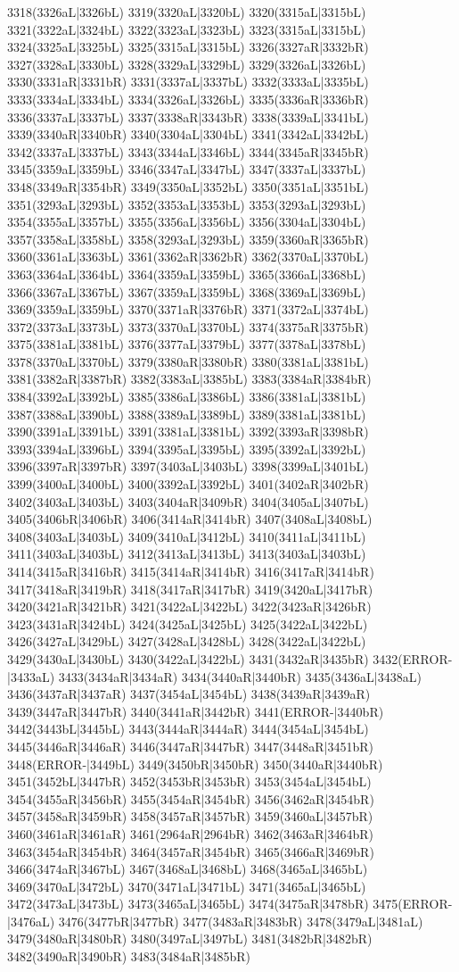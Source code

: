 3318(3326aL|3326bL) 3319(3320aL|3320bL) 3320(3315aL|3315bL) 3321(3322aL|3324bL) 3322(3323aL|3323bL) 3323(3315aL|3315bL) 3324(3325aL|3325bL) 3325(3315aL|3315bL) 3326(3327aR|3332bR) 3327(3328aL|3330bL) 3328(3329aL|3329bL) 3329(3326aL|3326bL) 3330(3331aR|3331bR) 3331(3337aL|3337bL) 3332(3333aL|3335bL) 3333(3334aL|3334bL) 3334(3326aL|3326bL) 3335(3336aR|3336bR) 3336(3337aL|3337bL) 3337(3338aR|3343bR) 3338(3339aL|3341bL) 3339(3340aR|3340bR) 3340(3304aL|3304bL) 3341(3342aL|3342bL) 3342(3337aL|3337bL) 3343(3344aL|3346bL) 3344(3345aR|3345bR) 3345(3359aL|3359bL) 3346(3347aL|3347bL) 3347(3337aL|3337bL) 3348(3349aR|3354bR) 3349(3350aL|3352bL) 3350(3351aL|3351bL) 3351(3293aL|3293bL) 3352(3353aL|3353bL) 3353(3293aL|3293bL) 3354(3355aL|3357bL) 3355(3356aL|3356bL) 3356(3304aL|3304bL) 3357(3358aL|3358bL) 3358(3293aL|3293bL) 3359(3360aR|3365bR) 3360(3361aL|3363bL) 3361(3362aR|3362bR) 3362(3370aL|3370bL) 3363(3364aL|3364bL) 3364(3359aL|3359bL) 3365(3366aL|3368bL) 3366(3367aL|3367bL) 3367(3359aL|3359bL) 3368(3369aL|3369bL) 3369(3359aL|3359bL) 3370(3371aR|3376bR) 3371(3372aL|3374bL) 3372(3373aL|3373bL) 3373(3370aL|3370bL) 3374(3375aR|3375bR) 3375(3381aL|3381bL) 3376(3377aL|3379bL) 3377(3378aL|3378bL) 3378(3370aL|3370bL) 3379(3380aR|3380bR) 3380(3381aL|3381bL) 3381(3382aR|3387bR) 3382(3383aL|3385bL) 3383(3384aR|3384bR) 3384(3392aL|3392bL) 3385(3386aL|3386bL) 3386(3381aL|3381bL) 3387(3388aL|3390bL) 3388(3389aL|3389bL) 3389(3381aL|3381bL) 3390(3391aL|3391bL) 3391(3381aL|3381bL) 3392(3393aR|3398bR) 3393(3394aL|3396bL) 3394(3395aL|3395bL) 3395(3392aL|3392bL) 3396(3397aR|3397bR) 3397(3403aL|3403bL) 3398(3399aL|3401bL) 3399(3400aL|3400bL) 3400(3392aL|3392bL) 3401(3402aR|3402bR) 3402(3403aL|3403bL) 3403(3404aR|3409bR) 3404(3405aL|3407bL) 3405(3406bR|3406bR) 3406(3414aR|3414bR) 3407(3408aL|3408bL) 3408(3403aL|3403bL) 3409(3410aL|3412bL) 3410(3411aL|3411bL) 3411(3403aL|3403bL) 3412(3413aL|3413bL) 3413(3403aL|3403bL) 3414(3415aR|3416bR) 3415(3414aR|3414bR) 3416(3417aR|3414bR) 3417(3418aR|3419bR) 3418(3417aR|3417bR) 3419(3420aL|3417bR) 3420(3421aR|3421bR) 3421(3422aL|3422bL) 3422(3423aR|3426bR) 3423(3431aR|3424bL) 3424(3425aL|3425bL) 3425(3422aL|3422bL) 3426(3427aL|3429bL) 3427(3428aL|3428bL) 3428(3422aL|3422bL) 3429(3430aL|3430bL) 3430(3422aL|3422bL) 3431(3432aR|3435bR) 3432(ERROR-|3433aL) 3433(3434aR|3434aR) 3434(3440aR|3440bR) 3435(3436aL|3438aL) 3436(3437aR|3437aR) 3437(3454aL|3454bL) 3438(3439aR|3439aR) 3439(3447aR|3447bR) 3440(3441aR|3442bR) 3441(ERROR-|3440bR) 3442(3443bL|3445bL) 3443(3444aR|3444aR) 3444(3454aL|3454bL) 3445(3446aR|3446aR) 3446(3447aR|3447bR) 3447(3448aR|3451bR) 3448(ERROR-|3449bL) 3449(3450bR|3450bR) 3450(3440aR|3440bR) 3451(3452bL|3447bR) 3452(3453bR|3453bR) 3453(3454aL|3454bL) 3454(3455aR|3456bR) 3455(3454aR|3454bR) 3456(3462aR|3454bR) 3457(3458aR|3459bR) 3458(3457aR|3457bR) 3459(3460aL|3457bR) 3460(3461aR|3461aR) 3461(2964aR|2964bR) 3462(3463aR|3464bR) 3463(3454aR|3454bR) 3464(3457aR|3454bR) 3465(3466aR|3469bR) 3466(3474aR|3467bL) 3467(3468aL|3468bL) 3468(3465aL|3465bL) 3469(3470aL|3472bL) 3470(3471aL|3471bL) 3471(3465aL|3465bL) 3472(3473aL|3473bL) 3473(3465aL|3465bL) 3474(3475aR|3478bR) 3475(ERROR-|3476aL) 3476(3477bR|3477bR) 3477(3483aR|3483bR) 3478(3479aL|3481aL) 3479(3480aR|3480bR) 3480(3497aL|3497bL) 3481(3482bR|3482bR) 3482(3490aR|3490bR) 3483(3484aR|3485bR) 